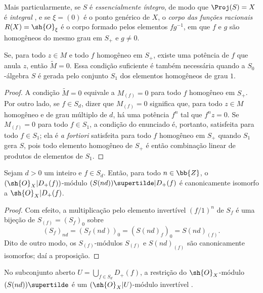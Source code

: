 \documentclass[oneside,10pt]{amsart}
\let\EGAOriginalLabel\label
\renewcommand{\label}[1]{\phantomsection\EGAOriginalLabel{#1}}
\begin{document}
Mais particularmente, se $S$ é \emph{essencialmente íntegro}, de modo que $\Proj(S)=X$ é \emph{integral} , e se $\xi=(0)$ é o ponto genérico de $X$, o \emph{corpo das funções racionais $R(X)=\sh{O}_\xi$} é o corpo formado pelos elementos $fg^{-1}$, em que $f$ e $g$ são homogêneos do mesmo grau em $S_+$ e $g\neq0$.

\begin{proposition}[2.5.6]
\label{II.2.5.6}
Se, para todo $z\in M$ e todo $f$ homogêneo em $S_+$, existe uma potência de $f$ que anula $z$, então $\widetilde{M}=0$.
Essa condição suficiente é também necessária quando a $S_0$-álgebra $S$ é gerada pelo conjunto $S_1$ dos elementos homogêneos de grau $1$.
\end{proposition}

\begin{proof}
A condição $\widetilde{M}=0$ equivale a $M_{(f)}=0$ para todo $f$ homogêneo em $S_+$.
Por outro lado, se $f\in S_d$, dizer que $M_{(f)}=0$ significa que, para todo $z\in M$ homogêneo e de grau múltiplo de $d$, há uma potência $f^n$ tal que $f^nz=0$.
Se $M_{(f)}=0$ para todo $f\in S_1$, a condição do enunciado é, portanto, satisfeita para todo $f\in S_1$; ela é \emph{a fortiori} satisfeita para todo $f$ homogêneo em $S_+$ quando $S_1$ gera $S$, pois todo elemento homogêneo de $S_+$ é então combinação linear de produtos de elementos de $S_1$.
\end{proof}

\begin{proposition}[2.5.7]
\label{II.2.5.7}
Sejam $d>0$ um inteiro e $f\in S_d$.
Então, para todo $n\in\bb{Z}$, o $(\sh{O}_X|D_+(f))$-módulo $(S(nd))\supertilde|D_+(f)$ é canonicamente isomorfo a $\sh{O}_X|D_+(f)$.
\end{proposition}

\begin{proof}
Com efeito, a multiplicação pelo elemento invertível $(f/1)^n$ de $S_f$ é uma bijeção de $S_{(f)}=(S_f)_0$ sobre
\[
  (S_f)_{nd}=(S_f(nd))_0=(S(nd)_f)_0=S(nd)_{(f)}.
\]
Dito de outro modo, os $S_{(f)}$-módulos $S_{(f)}$ e $S(nd)_{(f)}$ são canonicamente isomorfos; daí a proposição.
\end{proof}

\begin{corollary}[2.5.8]
\label{II.2.5.8}
No subconjunto aberto $U=\bigcup_{f\in S_d}D_+(f)$, a restrição do $\sh{O}_X$-módulo $(S(nd))\supertilde$ é um $(\sh{O}_X|U)$-módulo invertível .
\end{corollary}
\end{document}
